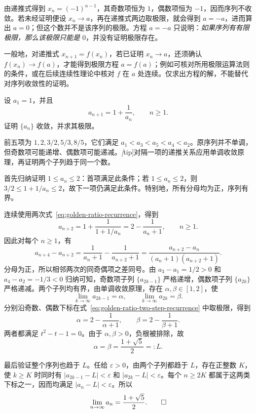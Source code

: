 \begin{solve}
由递推式得到 $x_n=(-1)^{n-1}$，其奇数项恒为 $1$，偶数项恒为 $-1$，因而序列不收敛。若未经证明便设 $x_n\to a$，再在递推式两边取极限，就会得到 $a=-a$，进而算出 $a=0$；但这个数并不是该序列的极限。方程 $a=-a$ 只说明：\emph{如果序列有有限极限，那么该极限只能是 $0$}，并没有证明极限存在。
\end{solve}

一般地，对递推式 $x_{n+1}=f(x_n)$，若已证明 $x_n\to a$，还须确认 $f(x_n)\to f(a)$，才能得到极限方程 $a=f(a)$；例如可核对所用极限运算法则的条件，或在后续连续性理论中核对 $f$ 在 $a$ 处连续。仅求出方程的解，不能替代对序列收敛性的证明。

\begin{example}
\label{ex:monotone-odd-even-golden-ratio}
设 $a_1=1$，并且
\begin{equation}
    a_{n+1}=1+\frac1{a_n},\qquad n\geq1.
    \label{eq:golden-ratio-recurrence}
\end{equation}
证明 $\{a_n\}$ 收敛，并求其极限。
\end{example}

\begin{analyze}
前五项为 $1,2,3/2,5/3,8/5$，它们满足 $a_1<a_3<a_5<a_4<a_2$。原序列并不单调，但奇数项可能递增、偶数项可能递减。\emph[tip]{对隔一项的递推关系应用单调收敛原理，再证明两个子列趋于同一个数。}
\end{analyze}

\begin{solve}
首先归纳证明 $1\leq a_n\leq2$：首项满足此条件；若 $1\leq a_n\leq2$，则 $3/2\leq1+1/a_n\leq2$，故下一项仍满足此条件。特别地，所有分母均为正，序列有界。

连续使用两次式~\eqref{eq:golden-ratio-recurrence}，得到
\begin{equation}
    a_{n+2}=1+\frac1{1+1/a_n}
    =2-\frac1{a_n+1},\qquad n\geq1.
    \label{eq:golden-ratio-two-step-recurrence}
\end{equation}
因此对每个 $n\geq1$，有
\[
    a_{n+4}-a_{n+2}
    =\frac1{a_n+1}-\frac1{a_{n+2}+1}
    =\frac{a_{n+2}-a_n}{(a_n+1)(a_{n+2}+1)}.
\]
分母为正，所以相邻两次的同奇偶项之差同号。由 $a_3-a_1=1/2>0$ 和 $a_4-a_2=-1/3<0$ 归纳可知，奇数项子列 $\{a_{2k-1}\}$ 严格递增，偶数项子列 $\{a_{2k}\}$ 严格递减。两个子列均有界，由单调收敛原理，存在 $\alpha,\beta\in[1,2]$，使
\[
    \lim_{k\to\infty}a_{2k-1}=\alpha,\qquad
    \lim_{k\to\infty}a_{2k}=\beta.
\]
分别沿奇数、偶数下标在式~\eqref{eq:golden-ratio-two-step-recurrence} 中取极限，得到
\[
    \alpha=2-\frac1{\alpha+1},\qquad
    \beta=2-\frac1{\beta+1}.
\]
两者都满足 $t^2-t-1=0$。由于 $\alpha,\beta>0$，负根被排除，故
\[
    \alpha=\beta=\frac{1+\sqrt5}{2}=:L.
\]

最后验证整个序列也趋于 $L$。任给 $\varepsilon>0$，由两个子列都趋于 $L$，存在正整数 $K$，使 $k\geq K$ 时同时有 $|a_{2k-1}-L|<\varepsilon$ 和 $|a_{2k}-L|<\varepsilon$。每个 $n\geq2K$ 都属于这两类下标之一，因而均满足 $|a_n-L|<\varepsilon$。所以
\[
    \lim_{n\to\infty}a_n=\frac{1+\sqrt5}{2}.\qedhere
\]
\end{solve}

